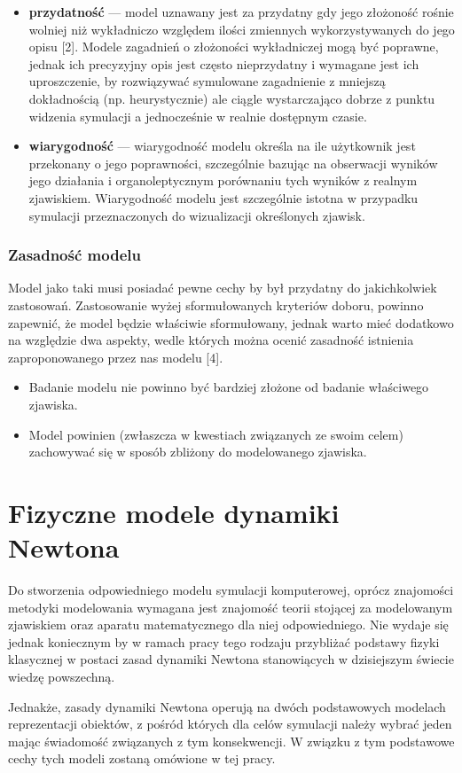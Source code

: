{\begin{itemize}
{\begin{center}
\textit{Popraność modelu względem modelowanego zjawiska [2].}
\end{center}
}
\item \textbf{przydatność} --- model uznawany jest za przydatny gdy jego złożoność rośnie wolniej niż wykładniczo względem ilości zmiennych wykorzystywanych do jego opisu [2]. Modele zagadnień o złożoności wykładniczej mogą być poprawne, jednak ich precyzyjny opis jest często nieprzydatny i wymagane jest ich uproszczenie, by rozwiązywać symulowane zagadnienie z mniejszą dokładnością (np. heurystycznie) ale ciągle wystarczająco dobrze z punktu widzenia symulacji a jednocześnie w realnie dostępnym czasie.
\item \textbf{wiarygodność} --- wiarygodność modelu określa na ile użytkownik jest przekonany o jego poprawności, szczególnie bazując na obserwacji wyników jego działania i organoleptycznym porównaniu tych wyników z realnym zjawiskiem. Wiarygodność modelu jest szczególnie istotna w przypadku symulacji przeznaczonych do wizualizacji określonych zjawisk.
\end{itemize}
}

\subsubsection{Zasadność modelu}
\par{
Model jako taki musi posiadać pewne cechy by był przydatny do jakichkolwiek zastosowań. Zastosowanie wyżej sformułowanych kryteriów doboru, powinno zapewnić, że model będzie właściwie sformułowany, jednak warto mieć dodatkowo na względzie dwa aspekty, wedle których można ocenić zasadność istnienia zaproponowanego przez nas modelu [4].
\begin{itemize}
\item Badanie modelu nie powinno być bardziej złożone od badanie właściwego zjawiska.
\item Model powinien (zwłaszcza w kwestiach związanych ze swoim celem) zachowywać się w sposób zbliżony do modelowanego zjawiska.
\end{itemize}
}


\section[Fizyczne modele dynamiki Newtona][Fizyczne modele dynamiki Newtona]{Fizyczne modele dynamiki Newtona}

\par{
Do stworzenia odpowiedniego modelu symulacji komputerowej, oprócz znajomości metodyki modelowania wymagana jest znajomość teorii stojącej za modelowanym zjawiskiem oraz aparatu matematycznego dla niej odpowiedniego. Nie wydaje się jednak koniecznym by w ramach pracy tego rodzaju przybliżać podstawy fizyki klasycznej w postaci zasad dynamiki Newtona stanowiących w dzisiejszym świecie wiedzę powszechną.
}
\par{
Jednakże, zasady dynamiki Newtona operują na dwóch podstawowych modelach reprezentacji obiektów, z pośród których dla celów symulacji należy wybrać jeden mając świadomość związanych z tym konsekwencji. W związku z tym podstawowe cechy tych modeli zostaną omówione w tej pracy.
}

